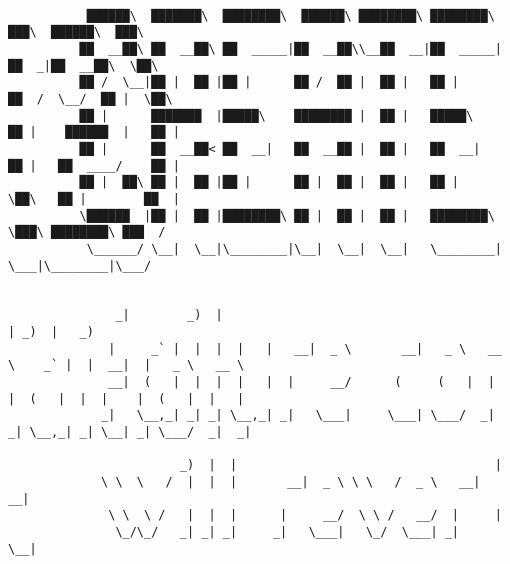 \documentclass[varwidth=\maxdimen,margin=0.5cm,multi={verbatim}]{standalone}
\begin{document}
\begin{verbatim}

           ██████\  ███████\  ████████\  ██████\ ████████\ ████████\      ███\  ██████\  ███\
          ██  __██\ ██  __██\ ██  _____|██  __██\\__██  __|██  _____|    ██  _|██  __██\  \██\
          ██ /  \__|██ |  ██ |██ |      ██ /  ██ |  ██ |   ██ |         ██  /  \__/  ██ |  \██\
          ██ |      ███████  |█████\    ████████ |  ██ |   █████\       ██ |    ██████  |   ██ |
          ██ |      ██  __██< ██  __|   ██  __██ |  ██ |   ██  __|      ██ |   ██  ____/    ██ |
          ██ |  ██\ ██ |  ██ |██ |      ██ |  ██ |  ██ |   ██ |         \██\   ██ |        ██  |
          \██████  |██ |  ██ |████████\ ██ |  ██ |  ██ |   ████████\     \███\ ████████\ ███  /
           \______/ \__|  \__|\________|\__|  \__|  \__|   \________|      \___|\________|\___/


               _|        _)  |                                                | _)  |   _)
              |     _` |  |  |  |   |   __|  _ \       __|   _ \   __ \    _` |  |  __|  |   _ \   __ \
              __|  (   |  |  |  |   |  |     __/      (     (   |  |   |  (   |  |  |    |  (   |  |   |
             _|   \__,_| _| _| \__,_| _|   \___|     \___| \___/  _|  _| \__,_| _| \__| _| \___/  _|  _|

                        _)  |  |                                    |
             \ \  \   /  |  |  |       __|  _ \ \ \   /  _ \   __|  __|
              \ \  \ /   |  |  |      |     __/  \ \ /   __/  |     |
               \_/\_/   _| _| _|     _|   \___|   \_/  \___| _|    \__|



\end{verbatim}
\end{document}

